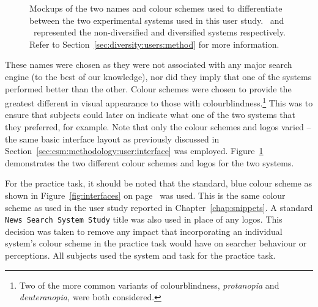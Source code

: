 \begin{figure}[t!]
    \centering
    \caption[Diversity user study interface mockups]{Mockups of the two names and colour schemes used to differentiate between the two experimental systems used in this user study. \hula~and \yoyo~represented the non-diversified and diversified systems respectively. Refer to Section~\ref{sec:diversity:users:method} for more information.}
    \label{fig:interface_headers}
\end{figure}

These names were chosen as they were not associated with any major search engine (to the best of our knowledge), nor did they imply that one of the systems performed better than the other. Colour schemes were chosen to provide the greatest different in visual appearance to those with colourblindness.\footnote{Two of the more common variants of colourblindness, \emph{protanopia} and \emph{deuteranopia,} were both considered.} This was to ensure that subjects could later on indicate what one of the two systems that they preferred, for example. Note that only the colour schemes and logos varied -- the same basic interface layout as previously discussed in Section~\ref{sec:csm:methodology:user:interface} was employed. Figure~\ref{fig:interface_headers} demonstrates the two different colour schemes and logos for the two systems.

For the practice task, it should be noted that the standard, blue colour scheme as shown in Figure~\ref{fig:interfaces} on page~\pageref{fig:interfaces} was used. This is the same colour scheme as used in the user study reported in Chapter~\ref{chap:snippets}. A standard \texttt{News Search System Study} title was also used in place of any logos. This decision was taken to remove any impact that incorporating an individual system's colour scheme in the practice task would have on searcher behaviour or perceptions. All subjects used the  system and task for the practice task.

